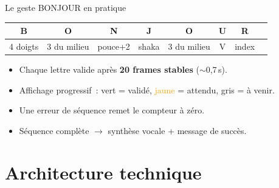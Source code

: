 \documentclass[aspectratio=169,12pt]{beamer}
\begin{document}
\begin{frame}{Le geste \og BONJOUR \fg{} en pratique}
  \begin{center}
  \small
  \begin{tabular}{cccccccc}
    \textbf{B} & \textbf{O} & \textbf{N} & \textbf{J} & \textbf{O} & \textbf{U} & \textbf{R} \\
    \midrule
    4 doigts & 3 du milieu & pouce+2 & shaka & 3 du milieu & V & index \\
  \end{tabular}
  \end{center}
  \vspace{0.4cm}
  \begin{itemize}
    \item Chaque lettre valide apr\`es \textbf{20 frames stables} ($\sim$0,7\,s).
    \item Affichage progressif~: \textcolor{green!60!black}{vert} = valid\'e, \textcolor{orange}{jaune} = attendu, gris = \`a venir.
    \item Une erreur de s\'equence remet le compteur \`a z\'ero.
    \item S\'equence compl\`ete $\rightarrow$ synth\`ese vocale + message de succ\`es.
  \end{itemize}
\end{frame}

\section{Architecture technique}
\end{document}
